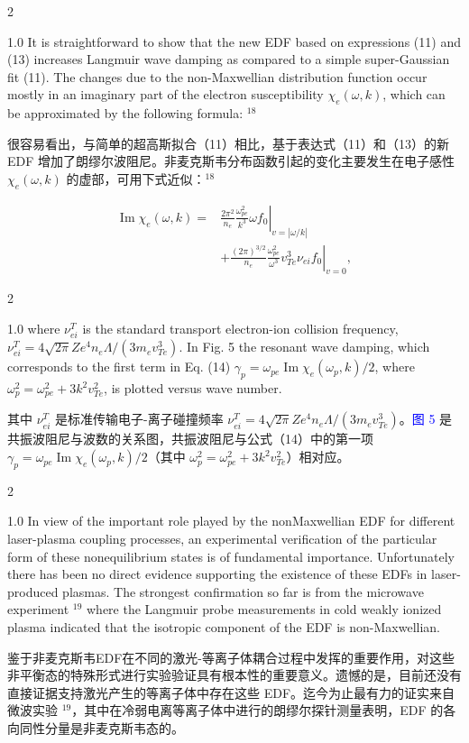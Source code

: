 \documentclass[oneside,onecolumn]{article}
\newcommand\enzhbox[2]{
  	\quad\par \begin{paracol}{2} \colseprulecolor{black} 
  			\begin{spacing}{1.0}
  				\footnotesize  #1
  			\end{spacing}
  		\switchcolumn[1] 
  		#2
  	\end{paracol} 
  }
\begin{document}
\begin{sloppypar}
 
\enzhbox{   It is straightforward to show that the new EDF based on expressions (11) and (13) increases Langmuir wave damping as compared to a simple super-Gaussian fit (11). The changes due to the non-Maxwellian distribution function occur mostly in an imaginary part of the electron susceptibility $\chi_{e}(\omega, k)$, which can be approximated by the following formula: ${ }^{18}$
}{
很容易看出，与简单的超高斯拟合（11）相比，基于表达式（11）和（13）的新 EDF 增加了朗缪尔波阻尼。非麦克斯韦分布函数引起的变化主要发生在电子感性 $\chi_{e}(\omega, k)$ 的虚部，可用下式近似：${ }^{18}$

}
  
  \begin{dmath}[compact]
  \begin{aligned}
  \operatorname{Im} \chi_{e}(\omega, k)= & \left.\frac{2 \pi^{2}}{n_{e}} \frac{\omega_{p e}^{2}}{k^{3}} \omega f_{0}\right|_{v=|\omega / k|} \\
  & +\left.\frac{(2 \pi)^{3 / 2}}{n_{e}} \frac{\omega_{p e}^{2}}{\omega^{3}} v_{T e}^{3} \nu_{e i} f_{0}\right|_{v=0},
  \end{aligned}
  \end{dmath}
  
 
\enzhbox{   where $\nu_{e i}^{T}$ is the standard transport electron-ion collision frequency, $\nu_{e i}^{T}=4 \sqrt{2 \pi} Z e^{4} n_{e} \Lambda /\left(3 m_{e} v_{T e}^{3}\right)$. In Fig. 5 the resonant wave damping, which corresponds to the first term in Eq. (14) $\gamma_{p}=\omega_{p e} \operatorname{Im} \chi_{e}\left(\omega_{p}, k\right) / 2$, where $\omega_{p}^{2}=\omega_{p e}^{2}+3 k^{2} v_{T e}^{2}$, is plotted versus wave number.
}{
其中 $\nu_{e i}^{T}$ 是标准传输电子-离子碰撞频率 $\nu_{e i}^{T}=4 \sqrt{2 \pi} Z e^{4} n_{e} \Lambda /\left(3 m_{e} v_{T e}^{3}\right)$。\textcolor{blue}{图 5} 是共振波阻尼与波数的关系图，共振波阻尼与公式（14）中的第一项 $\gamma_{p}=\omega_{p e} \operatorname{Im} \chi_{e}\left(\omega_{p}, k\right) / 2$（其中 $\omega_{p}^{2}=\omega_{p e}^{2}+3 k^{2} v_{T e}^{2}$）相对应。

}
  
 
\enzhbox{   In view of the important role played by the nonMaxwellian EDF for different laser-plasma coupling processes, an experimental verification of the particular form of these nonequilibrium states is of fundamental importance. Unfortunately there has been no direct evidence supporting the existence of these EDFs in laser-produced plasmas. The strongest confirmation so far is from the microwave experiment $^{19}$ where the Langmuir probe measurements in cold weakly ionized plasma indicated that the isotropic component of the EDF is non-Maxwellian.
}{
鉴于非麦克斯韦EDF在不同的激光-等离子体耦合过程中发挥的重要作用，对这些非平衡态的特殊形式进行实验验证具有根本性的重要意义。遗憾的是，目前还没有直接证据支持激光产生的等离子体中存在这些 EDF。迄今为止最有力的证实来自微波实验 $^{19}$，其中在冷弱电离等离子体中进行的朗缪尔探针测量表明，EDF 的各向同性分量是非麦克斯韦态的。

}
\end{sloppypar}
\end{document}
